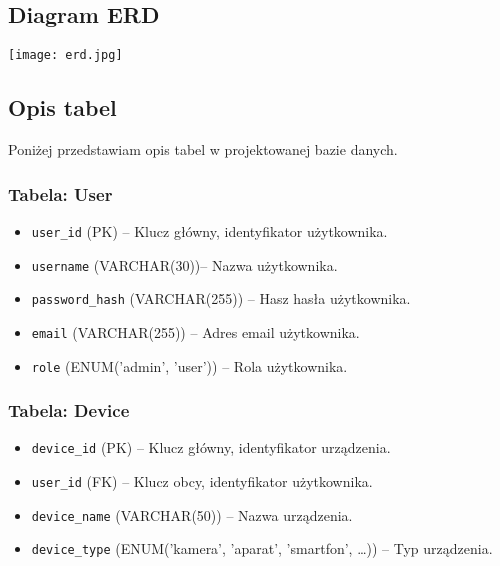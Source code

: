 \documentclass[12pt,a4paper]{article}
\begin{document}
\subsection{Diagram ERD}
\begin{center}
    \texttt{[image: erd.jpg]}
\end{center}

\subsection{Opis tabel}
Poniżej przedstawiam opis tabel w projektowanej bazie danych.

\subsubsection{Tabela: User}
\begin{itemize}
    \item \texttt{user\_id} (PK) -- Klucz główny, identyfikator użytkownika.
    \item \texttt{username} (VARCHAR(30))-- Nazwa użytkownika.
    \item \texttt{password\_hash} (VARCHAR(255)) -- Hasz hasła użytkownika.
    \item \texttt{email} (VARCHAR(255)) -- Adres email użytkownika.
    \item \texttt{role} (ENUM('admin', 'user')) -- Rola użytkownika.
\end{itemize}

\subsubsection{Tabela: Device}
\begin{itemize}
    \item \texttt{device\_id} (PK) -- Klucz główny, identyfikator urządzenia.
    \item \texttt{user\_id} (FK) -- Klucz obcy, identyfikator użytkownika.
    \item \texttt{device\_name} (VARCHAR(50)) -- Nazwa urządzenia.
    \item \texttt{device\_type} (ENUM('kamera', 'aparat', 'smartfon', \dots)) -- Typ urządzenia.
\end{itemize}
\end{document}
